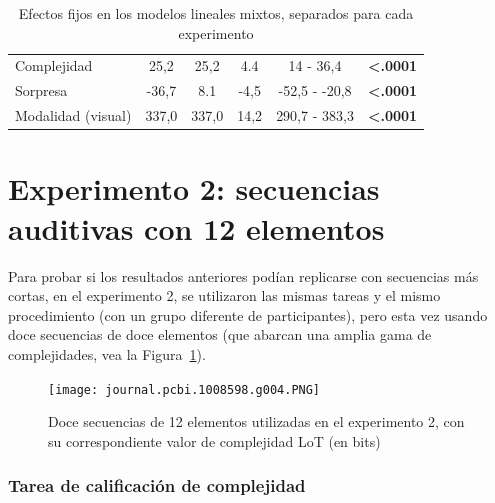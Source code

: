 \begin{table}[]
\begin{tabular}{lccccc}
Complejidad                   & 25,2                 & 25,2                 & 4.4                  & 14 - 36,4            & \textbf{\textless{}.0001} \\
Sorpresa                      & -36,7                & 8.1                  & -4,5                 & -52,5 - -20,8        & \textbf{\textless{}.0001} \\
Modalidad (visual)            & 337,0                & 337,0                & 14,2                 & 290,7 - 383,3        & \textbf{\textless{}.0001} \\ \hline
\end{tabular}
\caption{Efectos fijos en los modelos lineales mixtos, separados para cada experimento}
\label{PlosBIO-T1}
\end{table}

\section{Experimento 2: secuencias auditivas con 12 elementos}
\label{ploscomp-results-exp2}


Para probar si los resultados anteriores podían replicarse con secuencias más cortas, en el experimento 2, se utilizaron las mismas tareas y el mismo procedimiento (con un grupo diferente de participantes), pero esta vez usando doce secuencias de doce elementos (que abarcan una amplia gama de complejidades, vea la Figura~\ref{PlosBIO-F4}).

\begin{figure}[t!]
      \texttt{[image: journal.pcbi.1008598.g004.PNG]}
      \centering
      \caption{Doce secuencias de 12 elementos utilizadas en el experimento 2, con su correspondiente valor de complejidad LoT (en bits)}
      \label{PlosBIO-F4}
\end{figure}

\subsubsection{Tarea de calificación de complejidad}

